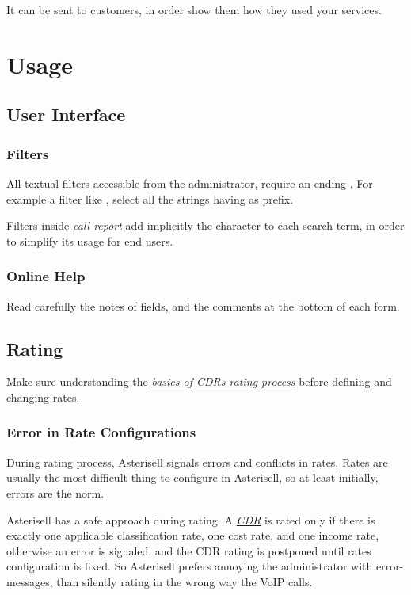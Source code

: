 \documentclass[letterpaper,10pt,english]{sphinxmanual}
\begin{document}
It can be sent to customers, in order show them how they used your services.


\chapter{Usage}
\label{index:usage}

\section{User Interface}
\label{index:user-interface}

\subsection{Filters}
\label{index:filters}
All textual filters accessible from the administrator, require an ending \code{*}. For example a filter like , select all the strings having  as prefix.

Filters inside {\hyperref[index:term-call-report]{\emph{call report}}} add implicitly the \code{*} character to each search term, in order to simplify its usage for end users.


\subsection{Online Help}
\label{index:online-help}
Read carefully the notes of fields, and the comments at the bottom of each form.


\section{Rating}
\label{index:rating}
Make sure understanding the {\hyperref[index:cdr-rating-process]{\emph{basics of CDRs rating process}}} before defining and changing rates.


\subsection{Error in Rate Configurations}
\label{index:error-in-rate-configurations}
During rating process, Asterisell signals errors and conflicts in rates. Rates are usually the most difficult thing to configure in Asterisell, so at least initially, errors are the norm.

Asterisell has a safe approach during rating. A {\hyperref[index:term-cdr]{\emph{CDR}}} is rated only if there is exactly one applicable classification rate, one cost rate, and one income rate, otherwise an error is signaled, and the CDR rating is postponed until rates configuration is fixed. So Asterisell prefers annoying the administrator with error-messages, than silently rating in the wrong way the VoIP calls.
\end{document}
